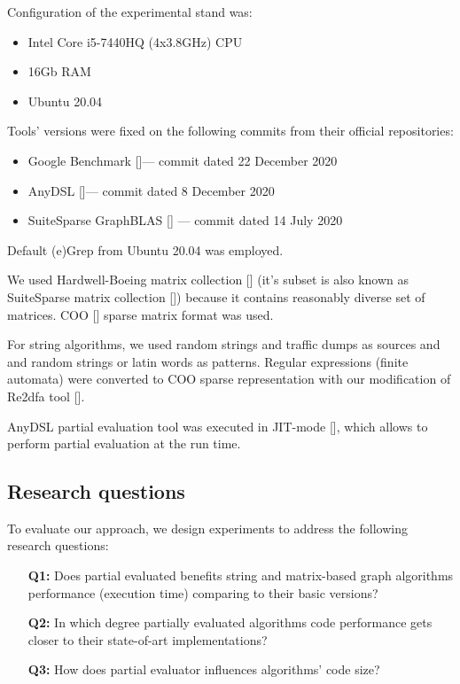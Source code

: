\documentclass[conference]{IEEEtran}
\begin{document}
Configuration of the experimental stand was:
\begin{itemize}
	\item Intel Core i5-7440HQ (4x3.8GHz) CPU
	\item 16Gb RAM
	\item Ubuntu 20.04
\end{itemize}

Tools' versions were fixed on the following commits from their official repositories:
\begin{itemize}
	\item Google Benchmark []--- commit dated 22 December 2020
	\item AnyDSL []--- commit dated 8 December 2020
	\item SuiteSparse GraphBLAS [] --- commit dated 14 July 2020
\end{itemize}

Default (e)Grep from Ubuntu 20.04 was employed.

We used Hardwell-Boeing matrix collection [] (it's subset is also known as SuiteSparse matrix collection []) because it contains reasonably diverse set of matrices. COO [] sparse matrix format was used.

For string algorithms, we used random strings and traffic dumps as sources and and random strings or latin words as patterns. Regular expressions (finite automata) were converted to COO sparse representation with our modification of Re2dfa tool [].

AnyDSL partial evaluation tool was executed in JIT-mode [], which allows to perform partial evaluation at the run time.



\subsection{Research questions}

To evaluate our approach, we design experiments to address the following research questions:

\begin{itemize}
	\item[\textbf{Q1:}] Does partial evaluated benefits string and matrix-based graph algorithms performance (execution time) comparing to their basic versions?
	\item[\textbf{Q2:}] In which degree partially evaluated algorithms code performance gets closer to their state-of-art implementations?
	\item[\textbf{Q3:}] How does partial evaluator influences algorithms' code size?
\end{itemize}
\end{document}
